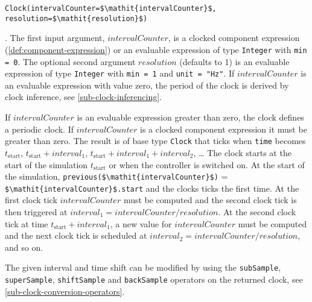 \begin{operatordefinition*}[Clock]\label{modelica:clock-rational}
\begin{synopsis}\begin{lstlisting}
Clock(intervalCounter=$\mathit{intervalCounter}$, resolution=$\mathit{resolution}$)
\end{lstlisting}\end{synopsis}
\begin{semantics}
.
The first input argument, $\mathit{intervalCounter}$, is a clocked component expression (\cref{def:component-expression}) or an evaluable expression of type \lstinline!Integer! with \lstinline!min = 0!.
The optional second argument $\mathit{resolution}$ (defaults to 1) is an evaluable expression of type \lstinline!Integer! with \lstinline!min = 1! and \lstinline!unit = "Hz"!.
If $\mathit{intervalCounter}$ is an evaluable expression with value zero, the period of the clock is derived by clock inference, see \cref{sub-clock-inferencing}.

If $\mathit{intervalCounter}$ is an evaluable expression greater than zero, the clock defines a periodic clock.
If $\mathit{intervalCounter}$ is a clocked component expression it must be greater than zero.
The result is of base type \lstinline!Clock! that ticks when \lstinline!time! becomes $t_{\mathrm{start}}$, $t_{\mathrm{start}} + \mathit{interval}_{1}$, $t_{\mathrm{start}} + \mathit{interval}_{1} + \mathit{interval}_{2}$, \@\ldots{}
The clock starts at the start of the simulation $t_{\mathrm{start}}$ or when the controller is switched on.
At the start of the simulation, \lstinline!previous($\mathit{intervalCounter}$)! = \lstinline!$\mathit{intervalCounter}$.start! and the clocks ticks the first time.
At the first clock tick $\mathit{intervalCounter}$ must be computed and the second clock tick is then triggered at $\mathit{interval}_{1} = \mathit{intervalCounter}/\mathit{resolution}$.
At the second clock tick at time $t_{\mathrm{start}} + \mathit{interval}_{1}$, a new value for $\mathit{intervalCounter}$ must be computed and the next clock tick is scheduled at $\mathit{interval}_{2} = \mathit{intervalCounter}/\mathit{resolution}$, and so on.


\begin{nonnormative}
The given interval and time shift %
can be modified by using the \lstinline!subSample!, \lstinline!superSample!, \lstinline!shiftSample! and \lstinline!backSample! operators on the returned clock, see \cref{sub-clock-conversion-operators}.
\end{nonnormative}


\end{semantics}
\end{operatordefinition*}
